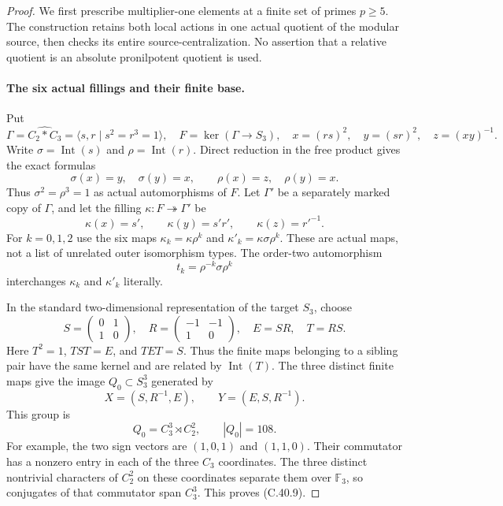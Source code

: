 \begin{proof}
We first prescribe multiplier-one elements at a finite set of
primes $p\geq5$. The construction retains both local actions
in one actual quotient of the modular source, then checks its
entire source-centralization. No assertion that a relative
quotient is an absolute pronilpotent quotient is used.

\paragraph{The six actual fillings and their finite base.}
Put
\[
 \Gamma=\widehat{C_2*C_3}=\langle s,r\mid s^2=r^3=1\rangle,
 \quad F=\ker(\Gamma\to S_3),\quad
 x=(rs)^2,\quad y=(sr)^2,\quad z=(xy)^{-1}.
                                                        \tag{C.40.3}
\]
Write $\sigma=\operatorname{Int}(s)$ and
$\rho=\operatorname{Int}(r)$. Direct reduction in the free
product gives the exact formulas
\[
 \sigma(x)=y,\quad\sigma(y)=x,\qquad
 \rho(x)=z,\quad\rho(y)=x.                              \tag{C.40.4}
\]
Thus $\sigma^2=\rho^3=1$ as actual automorphisms of $F$.
Let $\Gamma'$ be a separately marked copy of $\Gamma$, and
let the filling $\kappa:F\twoheadrightarrow\Gamma'$ be
\[
       \kappa(x)=s',\qquad \kappa(y)=s'r',\qquad
                         \kappa(z)=r'^{-1}.
                                                        \tag{C.40.5}
\]
For $k=0,1,2$ use the six maps
$\kappa_k=\kappa\rho^k$ and
$\kappa'_k=\kappa\sigma\rho^k$. These are actual maps,
not a list of unrelated outer isomorphism types. The order-two
automorphism
\[
                     t_k=\rho^{-k}\sigma\rho^k
                                                        \tag{C.40.6}
\]
interchanges $\kappa_k$ and $\kappa'_k$ literally.

In the standard two-dimensional representation of the target
$S_3$, choose
\[
 S=\begin{pmatrix}0&1\\1&0\end{pmatrix},\quad
 R=\begin{pmatrix}-1&-1\\1&0\end{pmatrix},\quad
 E=SR,\quad T=RS.
                                                        \tag{C.40.7}
\]
Here $T^2=1$, $TST=E$, and $TET=S$. Thus the finite
maps belonging to a sibling pair have the same kernel and
are related by $\operatorname{Int}(T)$. The three distinct
finite maps give the image $Q_0\subset S_3^3$ generated by
\[
             X=(S,R^{-1},E),\qquad Y=(E,S,R^{-1}).
                                                        \tag{C.40.8}
\]
This group is
\[
                  Q_0=C_3^3\rtimes C_2^2,
                       \qquad |Q_0|=108.              \tag{C.40.9}
\]
For example, the two sign vectors are $(1,0,1)$ and
$(1,1,0)$. Their commutator has a nonzero entry in each
of the three $C_3$ coordinates. The three distinct
nontrivial characters of $C_2^2$ on these coordinates
separate them over $\mathbb F_3$, so conjugates of that
commutator span $C_3^3$. This proves (C.40.9).


\end{proof}

